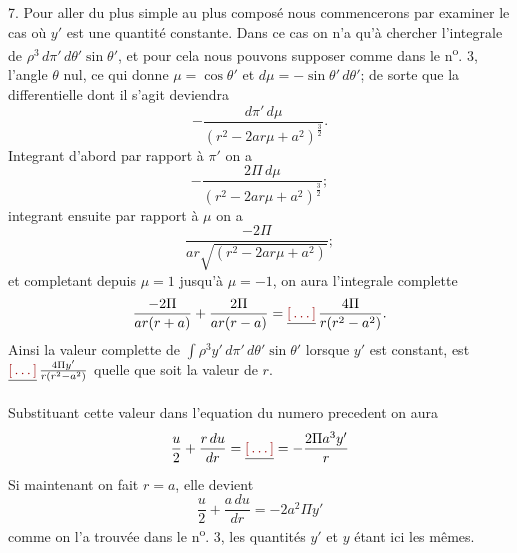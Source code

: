 \documentclass[11pt,a4paper]{article}
\begin{document}
7. Pour aller du plus simple au plus composé nous commencerons par examiner le cas où $y'$ est une quantité constante. Dans ce cas on n'a qu'à chercher l'integrale de \struck{\ill{}} $\rho^3\,d\pi'\,d\theta' \sin\theta'$, et pour cela nous pouvons supposer comme dans le n\textsuperscript{o}. 3, l'angle $\theta$ nul, ce qui donne $\mu = \cos\theta'$ et $d\mu = -\sin\theta'\,d\theta'$; de sorte que la differentielle dont il s'agit deviendra
\[ -\frac{d\pi'\,d\mu}{(r^2 - 2ar\mu + a^2)^{\frac{3}{2}}}. \]
Integrant d'abord par rapport à $\pi'$ on a
\[ -\frac{2\Pi\,d\mu}{(r^2 - 2ar\mu + a^2)^{\frac{3}{2}}}; \]
integrant ensuite par rapport à $\mu$ on a
\[ \frac{-2\Pi}{ar\sqrt{(r^2 - 2ar\mu + a^2)}}; \]
et completant depuis $\mu = 1$ jusqu'à $\mu = -1$, on aura l'integrale complette
\[ \frac{-2\Pi}{ar(r+a)} + \frac{2\Pi}{ar(r-a)} = \struck{\ill{}}\,\frac{4\Pi}{r(r^2 - a^2)}. \]
Ainsi la valeur complette de $\int \rho^3 y'\,d\pi'\,d\theta' \sin\theta'$ lorsque $y'$ est constant, est $\struck{\ill{}}\,\frac{4\Pi y'}{r(r^2 - a^2)}$ quelle que soit la valeur de $r$.

Substituant cette valeur dans l'equation du numero precedent on aura
\[ \frac{u}{2} + \frac{r\,d u}{d r} = \struck{\ill{}} = -\frac{2\Pi a^3 y'}{r} \]
Si maintenant on fait $r = a$, elle devient
\[ \frac{u}{2} + \frac{a\,d u}{d r} = -2a^2\Pi y' \]
comme on l'a trouvée dans le n\textsuperscript{o}. 3, les quantités $y'$ et $y$ étant ici les mêmes.

\end{document}
